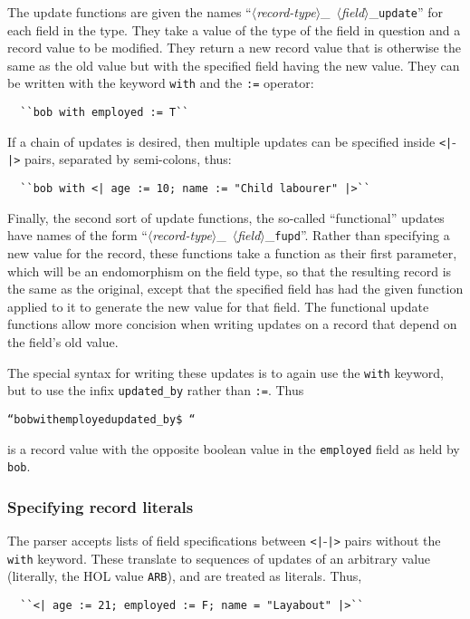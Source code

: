 \documentclass[12pt,fleqn,a4paper]{report}
\begin{document}
The update functions are given the names
\mbox{``$\langle$\textsl{record-type\/}$\rangle$\_%
$\langle$\textsl{field\/}$\rangle$\_\texttt{update}''} for each
field in the type.  They take a value of the type of the field in
question and a record value to be modified.  They return a new record
value that is otherwise the same as the old value but with the
specified field having the new value.  They can be written with the
keyword \texttt{with} and the \texttt{:=} operator:
\begin{verbatim}
  ``bob with employed := T``
\end{verbatim}
\noindent If a chain of updates is desired, then multiple updates can
be specified inside \texttt{<|}-\texttt{|>} pairs, separated by
semi-colons, thus:

\begin{verbatim}
  ``bob with <| age := 10; name := "Child labourer" |>``
\end{verbatim}

\noindent Finally, the second sort of update functions, the so-called
``functional'' updates have names of the form
\mbox{``$\langle$\textsl{record-type\/}$\rangle$\_%
$\langle$\textsl{field\/}$\rangle$\_\texttt{fupd}''}. Rather than
specifying a new value for the record, these functions take a function
as their first parameter, which will be an endomorphism on the field
type, so that the resulting record is the same as the original, except
that the specified field has had the given function applied to it to
generate the new value for that field.  The functional update
functions allow more concision when writing updates on a record that
depend on the field's old value.

The special syntax for writing these updates is to again use the
\texttt{with} keyword, but to use the infix \texttt{updated\_by}
rather than \texttt{:=}.  Thus
\begin{alltt}
  ``bob with employed updated_by \$~``
\end{alltt} \noindent
is a record value with the opposite boolean value in the
\texttt{employed} field as held by \texttt{bob}.

\subsubsection{Specifying record literals}

The parser accepts lists of field specifications between
\texttt{<|}-\texttt{|>} pairs without the \texttt{with} keyword.
These translate to sequences of updates of an arbitrary value
(literally, the HOL value \texttt{ARB}), and are treated as literals.
Thus,
\begin{verbatim}
  ``<| age := 21; employed := F; name = "Layabout" |>``
\end{verbatim}
\end{document}
